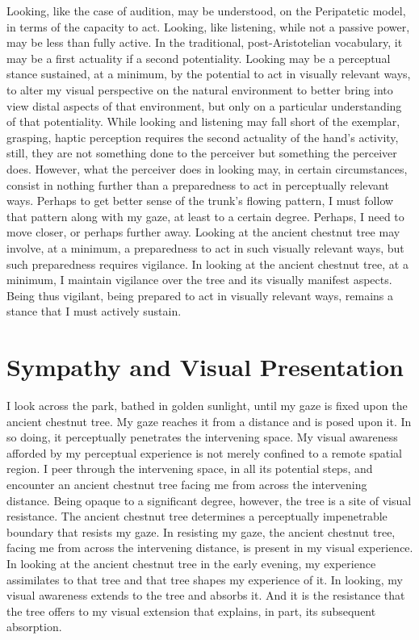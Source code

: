 Looking, like the case of audition, may be understood, on the Peripatetic model, in terms of the capacity to act. Looking, like listening, while not a passive power, may be less than fully active. In the traditional, post-Aristotelian vocabulary, it may be a first actuality if a second potentiality. Looking may be a perceptual stance sustained, at a minimum, by the potential to act in visually relevant ways, to alter my visual perspective on the natural environment to better bring into view distal aspects of that environment, but only on a particular understanding of that potentiality. While looking and listening may fall short of the exemplar, grasping, haptic perception requires the second actuality of the hand's activity, still, they are not something done to the perceiver but something the perceiver does. However, what the perceiver does in looking may, in certain circumstances, consist in nothing further than a preparedness to act in perceptually relevant ways. Perhaps to get better sense of the trunk's flowing pattern, I must follow that pattern along with my gaze, at least to a certain degree. Perhaps, I need to move closer, or perhaps further away. Looking at the ancient chestnut tree may involve, at a minimum, a preparedness to act in such visually relevant ways, but such preparedness requires vigilance. In looking at the ancient chestnut tree, at a minimum, I maintain vigilance over the tree and its visually manifest aspects. Being thus vigilant, being prepared to act in visually relevant ways, remains a stance that I must actively sustain.


\section{Sympathy and Visual Presentation} %
\label{sec:sympathy_and_visual_presentation}

I look across the park, bathed in golden sunlight, until my gaze is fixed upon the ancient chestnut tree. My gaze reaches it from a distance and is posed upon it. In so doing, it perceptually penetrates the intervening space. My visual awareness afforded by my perceptual experience is not merely confined to a remote spatial region. I peer through the intervening space, in all its potential steps, and encounter an ancient chestnut tree facing me from across the intervening distance. Being opaque to a significant degree, however, the tree is a site of visual resistance. The ancient chestnut tree determines a perceptually impenetrable boundary that resists my gaze. In resisting my gaze, the ancient chestnut tree, facing me from across the intervening distance, is present in my visual experience. In looking at the ancient chestnut tree in the early evening, my experience assimilates to that tree and that tree shapes my experience of it. In looking, my visual awareness extends to the tree and absorbs it. And it is the resistance that the tree offers to my visual extension that explains, in part, its subsequent absorption.

